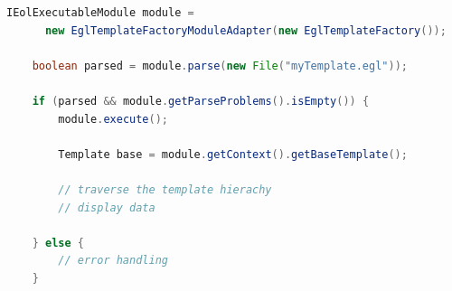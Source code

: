 \begin{lstlisting}[float=tbp, caption=Programmatically accessing the EGL traceability API (in Java)., label=lst:traceability, language=Java]
	IEolExecutableModule module = 
	  new EglTemplateFactoryModuleAdapter(new EglTemplateFactory());
	
	boolean parsed = module.parse(new File("myTemplate.egl"));
	
	if (parsed && module.getParseProblems().isEmpty()) {
		module.execute();

		Template base = module.getContext().getBaseTemplate();
		
		// traverse the template hierachy
		// display data 
		
	} else {
		// error handling
	}
\end{lstlisting}